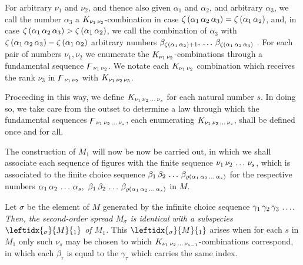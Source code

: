 \documentclass{amsart}
\newcommand\Rank[1]{\varrho\left(#1\right)}
\newcommand\Max[1]{\zeta\left(#1\right)}
\begin{document}
For arbitrary $\nu_1$ and $\nu_2$, and thence also given $\alpha_1$ and
$\alpha_2$, and arbitrary $\alpha_3$, we call the number $\alpha_3$ a
$K_{\Sequence{\nu_1,\nu_2}}$-combination in case $\Max{\Sequence{\alpha_1,\alpha_2,\alpha_3}} =
\Max{\Sequence{\alpha_1,\alpha_2}}$, and, in case $\Max{\Sequence{\alpha_1,\alpha_2,\alpha_3}} >
\Max{\Sequence{\alpha_1,\alpha_2}}$, we  call the combination of
$\alpha_3$ with $\Max{\Sequence{\alpha_1,\alpha_2,\alpha_3}} - \Max{\Sequence{\alpha_1,\alpha_2}}$
arbitrary numbers $\beta_{\Max{\Sequence{\alpha_1,\alpha_2}} +
1},\,\dots\,\beta_{\Max{\Sequence{\alpha_1,\alpha_2,\alpha_3}}}$ . For each pair of numbers $\nu_1,
\nu_2$ we enumerate the $K_{\Sequence{\nu_1,\nu_2}}$-combinations through a
fundamental sequence $\digamma_{\Sequence{\nu_1,\nu_2}}$. We notate each
$K_{\Sequence{\nu_1,\nu_2}}$ combination which receives the rank $\nu_3$ in
$\digamma_{\Sequence{\nu_1,\nu_2}}$ with $K_{\Sequence{\nu_1,\nu_2,\nu_3}}$.

Proceeding in this way, we define $K_{\Sequence{\nu_1,\nu_2,\dots,\nu_s}}$ for each natural
number $s$. In doing so, we take care from the outset to determine a
law through which the fundamental sequences $\digamma_{\Sequence{\nu_1,\nu_2,\dots,\nu_s}}$,
each enumerating $K_{\Sequence{\nu_1,\nu_2,\dots,\nu_s}}$, shall be defined once and for all.

The construction of $M_1$ will now be now be carried out, in which we shall
associate each sequence of figures with the finite sequence
$\Sequence{\nu_1,\nu_2,\dots,\nu_s}$, which is associated to the finite choice sequence
$\Sequence{\beta_1,\beta_2,\dots,\beta_{\Rank{\Sequence{\alpha_1,\alpha_2,\dots,\alpha_s}}}}$
for the respective numbers $\Sequence{\alpha_1,\alpha_2,\dots,\alpha_s},\
\Sequence{\beta_1,\beta_2,\dots,\beta_{\Rank{\Sequence{\alpha_1,\alpha_2,\dots,\alpha_s}}}}$
in $M$.

\bigskip

Let $\sigma$ be the element of $M$ generated by the infinite choice sequence
$\Sequence{\gamma_1,\gamma_2,\gamma_3,\dots}$. \emph{Then, the second-order
spread $M_\sigma$ is identical with a subspecies $\leftidx{_\sigma}{M}{_1}$ of
$M_1$.} This $\leftidx{_\sigma}{M}{_1}$ arises when for each $s$ in $M_1$ only
such $\nu_s$ may be chosen to which
$K_{\Sequence{\nu_1,\nu_2,\dots,\nu_{s-1}}}$-combinations correspond, in which
each $\beta_\tau$ is equal to the $\gamma_\tau$ which carries the same
index.
\end{document}
